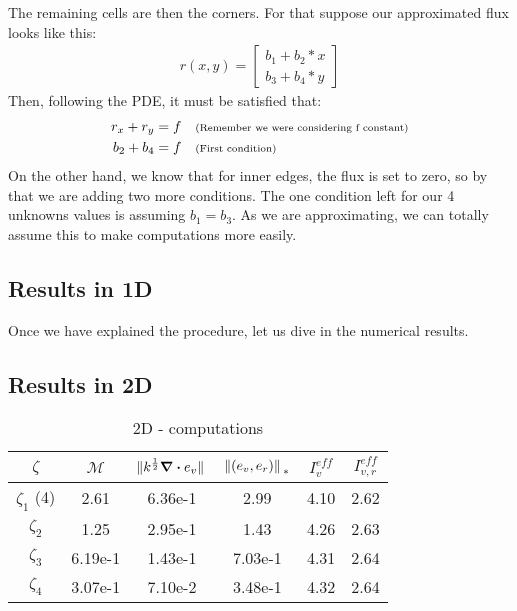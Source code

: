 \documentclass{article}
\begin{document}
    The remaining cells are then the corners. For that suppose our approximated flux looks like this:
    \begin{align*}
        r(x,y) = \begin{bmatrix}
            b_1+b_2*x\\
            b_3+b_4*y
            \end{bmatrix}
    \end{align*}
    Then, following the PDE, it must be satisfied that:
    \begin{align*}
        r_x + r_y &= f \quad \text{\scriptsize{(Remember we were considering f constant)}}\\
        b_2 + b_4 &= f \quad \text{\scriptsize{(First condition)}}
    \end{align*}
    On the other hand, we know that for inner edges, the flux is set to zero, so by that we are adding two more conditions. The one condition left for our 4 unknowns values is assuming $b_1 = b_3$. As we are approximating, we can totally assume this to make computations more easily. 

    \subsection*{Results in 1D}
    Once we have explained the procedure, let us dive in the numerical results.

    \subsection*{Results in 2D}
    \begin{table}[h!]
        \begin{tabular}{c | c | c | c | c | c }
            $\zeta$ & $\mathcal{M}$  & $\norm*{k^{\frac{1}{2}}\div e_v}$ & $\norm*{(e_v,e_r)}_{*}$ & $I_v^{eff}$ & $I_{v,r}^{eff}$ \\
            \hline \hline
            $\zeta_1$ (4) & 2.61 & 6.36e-1 & 2.99 & 4.10 & 2.62 \\ 
            $\zeta_2$ & 1.25 & 2.95e-1 & 1.43 & 4.26 & 2.63 \\
            $\zeta_3$ & 6.19e-1 & 1.43e-1& 7.03e-1 & 4.31 & 2.64 \\
            $\zeta_4$ & 3.07e-1 & 7.10e-2 & 3.48e-1 & 4.32 & 2.64 \\
        \end{tabular}
        \caption{2D - computations}
    \end{table}
\end{document}

